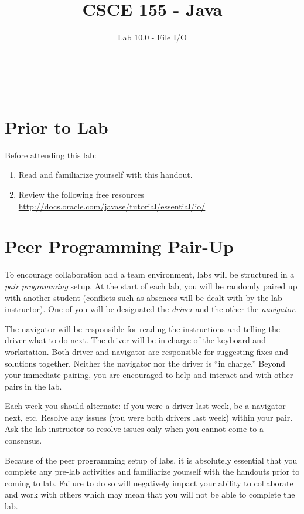 \documentclass[12pt]{scrartcl}
\title{CSCE 155 - Java}
\subtitle{Lab 10.0 - File I/O}
\author{~}
\date{~}
\begin{document}
\maketitle

\section*{Prior to Lab}

Before attending this lab:
\begin{enumerate}
  \item Read and familiarize yourself with this handout.
  \item Review the following free resources 
  \url{http://docs.oracle.com/javase/tutorial/essential/io/}
\end{enumerate}

\section*{Peer Programming Pair-Up}

To encourage collaboration and a team environment, labs will be
structured in a \emph{pair programming} setup.  At the start of
each lab, you will be randomly paired up with another student 
(conflicts such as absences will be dealt with by the lab instructor).
One of you will be designated the \emph{driver} and the other
the \emph{navigator}.  

The navigator will be responsible for reading the instructions and
telling the driver what to do next.  The driver will be in charge of the
keyboard and workstation.  Both driver and navigator are responsible
for suggesting fixes and solutions together.  Neither the navigator
nor the driver is ``in charge.''  Beyond your immediate pairing, you
are encouraged to help and interact and with other pairs in the lab.

Each week you should alternate: if you were a driver last week, 
be a navigator next, etc.  Resolve any issues (you were both drivers
last week) within your pair.  Ask the lab instructor to resolve issues
only when you cannot come to a consensus.  

Because of the peer programming setup of labs, it is absolutely 
essential that you complete any pre-lab activities and familiarize
yourself with the handouts prior to coming to lab.  Failure to do
so will negatively impact your ability to collaborate and work with 
others which may mean that you will not be able to complete the
lab.  
\end{document}
